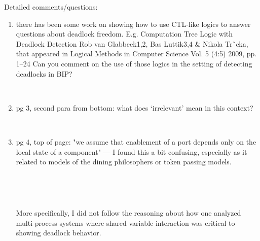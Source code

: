 Detailed comments/questions:
\begin{enumerate}

\item there has been some work on showing how to use CTL-like logics to answer
questions about deadlock freedom.  E.g.
  Computation Tree Logic with Deadlock Detection
  Rob van Glabbeek1,2, Bas Luttik3,4 \& Nikola Trˇcka, that appeared in
  Logical Methods in Computer Science
  Vol. 5 (4:5) 2009, pp. 1–24
Can you comment on the use of those logics in the setting of detecting deadlocks in
BIP?

~


\item  pg 3, second para from bottom: what does `irrelevant' mean in this context?

~


\item pg 4, top of page: "we assume that enablement of a port depends only on the
local state of a component" --- I found this a bit confusing, especially as it related
to models of the dining philosophers or token passing models.  
    
    ~
    

~ 

More specifically, I
did not follow the reasoning about how one analyzed multi-process systems
where shared variable interaction was critical to showing deadlock behavior.

~


\end{enumerate}
